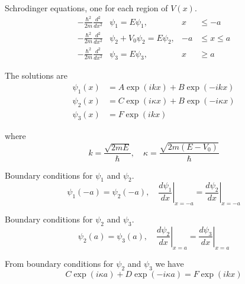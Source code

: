 


Schrodinger equations, one for each region of $V(x)$.
\begin{align*}
-\frac{\hbar^2}{2m}\frac{d^2}{dx^2}&\psi_1=E\psi_1, & x&\le-a
\\[1ex]
-\frac{\hbar^2}{2m}\frac{d^2}{dx^2}&\psi_2+V_0\psi_2=E\psi_2, & -a&\le x\le a
\\[1ex]
-\frac{\hbar^2}{2m}\frac{d^2}{dx^2}&\psi_3=E\psi_3, & x&\ge a
\end{align*}

The solutions are
\begin{align*}
\psi_1(x)&=A\exp(ikx)+B\exp(-ikx)
\\
\psi_2(x)&=C\exp(i\kappa x)+B\exp(-i\kappa x)
\\
\psi_3(x)&=F\exp(ikx)
\end{align*}

where
\begin{equation*}
k=\frac{\sqrt{2mE}}{\hbar},\quad
\kappa=\frac{\sqrt{2m(E-V_0)}}{\hbar}
\end{equation*}

Boundary conditions for $\psi_1$ and $\psi_2$.
\begin{equation*}
\psi_1(-a)=\psi_2(-a),\quad
\left.\frac{d\psi_1}{dx}\right|_{x=-a}=\left.\frac{d\psi_2}{dx}\right|_{x=-a}
\end{equation*}

Boundary conditions for $\psi_2$ and $\psi_3$.
\begin{equation*}
\psi_2(a)=\psi_3(a),\quad
\left.\frac{d\psi_2}{dx}\right|_{x=a}=\left.\frac{d\psi_3}{dx}\right|_{x=a}
\end{equation*}

From boundary conditions for $\psi_2$ and $\psi_3$ we have
\begin{equation*}
C\exp(i\kappa a)+D\exp(-i\kappa a)=F\exp(ikx)\tag{1}
\end{equation*}

